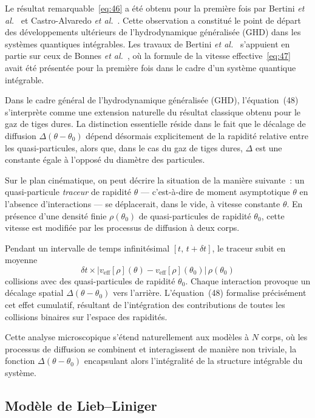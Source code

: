 Le résultat remarquable~\eqref{eq:46} a été obtenu pour la première fois par Bertini \emph{et al.}~\cite{Bertini2016} et Castro-Alvaredo \emph{et al.}~\cite{CastroAlvaredo2016}. Cette observation a constitué le point de départ des développements ultérieurs de l’hydrodynamique généralisée (GHD) dans les systèmes quantiques intégrables. Les travaux de Bertini \emph{et al.}~\cite{Bertini2016} s’appuient en partie sur ceux de Bonnes \emph{et al.}~\cite{Bonnes2014}, où la formule de la vitesse effective~\eqref{eq:47} avait été présentée pour la première fois dans le cadre d’un système quantique intégrable.

Dans le cadre général de l’hydrodynamique généralisée (GHD), l’équation~(48) s’interprète comme une extension naturelle du résultat classique obtenu pour le gaz de tiges dures. La distinction essentielle réside dans le fait que le décalage de diffusion \(\Delta(\theta - \theta_0)\) dépend désormais explicitement de la rapidité relative entre les quasi-particules, alors que, dans le cas du gaz de tiges dures, \(\Delta\) est une constante égale à l’opposé du diamètre des particules.

Sur le plan cinématique, on peut décrire la situation de la manière suivante~: un quasi-particule \emph{traceur} de rapidité \(\theta\) --- c’est-à-dire de moment asymptotique \(\theta\) en l’absence d’interactions --- se déplacerait, dans le vide, à vitesse constante \( \theta \). En présence d’une densité finie \(\rho(\theta_0)\) de quasi-particules de rapidité \(\theta_0\), cette vitesse est modifiée par les processus de diffusion à deux corps.

Pendant un intervalle de temps infinitésimal \([t,\, t + \delta t]\), le traceur subit en moyenne
\[
\delta t \times \left| v_{\mathrm{eff}}[\rho](\theta) - v_{\mathrm{eff}}[\rho](\theta_0) \right| \, \rho(\theta_0)
\]
collisions avec des quasi-particules de rapidité \(\theta_0\). Chaque interaction provoque un décalage spatial \(\Delta(\theta - \theta_0)\) vers l’arrière. L’équation~(48) formalise précisément cet effet cumulatif, résultant de l’intégration des contributions de toutes les collisions binaires sur l’espace des rapidités.

Cette analyse microscopique s’étend naturellement aux modèles à \(N\) corps, où les processus de diffusion se combinent et interagissent de manière non triviale, la fonction \(\Delta(\theta - \theta_0)\) encapsulant alors l’intégralité de la structure intégrable du système.

\subsection{Modèle de Lieb–Liniger}

